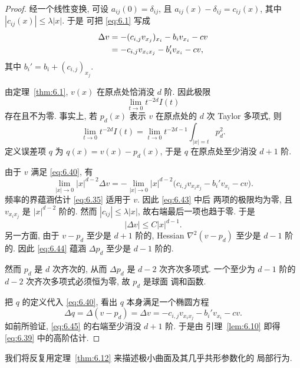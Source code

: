 \begin{proof}
经一个线性变换, 可设 $a_{ij}(0)=\delta_{ij}$, 且
$a_{ij}(x)-\delta_{ij}=c_{ij}(x)$, 其中 $|c_{ij}(x)|\leq\lambda|x|$. 于是
可把 \eqref{eq:6.1} 写成
\begin{align}
\Delta v&=-(c_{i,j}v_{x_j})_{x_i}-b_iv_{x_i}-cv\notag\\
&=-c_{i,j}v_{x_ix_j}-b_i'v_{x_i}-cv,
\label{eq:6.40}
\end{align}
其中 $b_i'=b_i+(c_{i,j})_{x_j}$.

由定理~\ref{thm:6.1}, $v(x)$ 在原点处恰消没 $d$ 阶. 因此极限
\begin{equation}
\lim_{t\to0}t^{-2d}I(t)
\label{eq:6.41}
\end{equation}
存在且不为零. 事实上, 若 $p_d(x)$ 表示 $v$ 在原点处的 $d$ 次 Taylor
多项式, 则
\begin{equation}
\lim_{t\to0}t^{-2d}I(t)=\lim_{t\to0}t^{-2d-1}\int_{|x|=t}p_d^2.
\label{eq:6.42}
\end{equation}
定义误差项 $q$ 为 $q(x)=v(x)-p_d(x)$, 于是 $q$ 在原点处至少消没 $d+1$ 阶.

由于 $v$ 满足 \eqref{eq:6.40}, 有
\begin{equation}
\lim_{|x|\to0}|x|^{d-2}\Delta v
=-\lim_{|x|\to0}|x|^{d-2}\bigl(c_{i,j}v_{x_ix_j}-b_i'v_{x_i}-cv\bigr).
\label{eq:6.43}
\end{equation}
频率的界蕴涵估计 \eqref{eq:6.35} 适用于 $v$. 因此 \eqref{eq:6.43} 中后
两项的极限均为零, 且 $v_{x_ix_j}$ 是 $|x|^{d-2}$ 阶的. 然而
$|c_{ij}|\leq\lambda|x|$, 故右端最后一项也趋于零. 于是
\begin{equation}
|\Delta v|\leq C|x|^{d-1}.
\label{eq:6.44}
\end{equation}
另一方面, 由于 $v-p_d$ 至少是 $d+1$ 阶的, Hessian $\nabla^2(v-p_d)$
至少是 $d-1$ 阶的. 因此 \eqref{eq:6.44} 蕴涵 $\Delta p_d$ 至少是
$d-1$ 阶的.

然而 $p_d$ 是 $d$ 次齐次的, 从而 $\Delta p_d$ 是 $d-2$ 次齐次多项式.
一个至少为 $d-1$ 阶的 $d-2$ 次齐次多项式必须恒为零, 故 $p_d$ 是球面
调和函数.

把 $q$ 的定义代入 \eqref{eq:6.40}, 看出 $q$ 本身满足一个椭圆方程
\begin{equation}
\Delta q=\Delta(v-p_d)=\Delta v
=-c_{i,j}v_{x_ix_j}-b_i'v_{x_i}-cv.
\label{eq:6.45}
\end{equation}
如前所验证, \eqref{eq:6.45} 的右端至少消没 $d+1$ 阶. 于是由
引理~\ref{lem:6.10} 即得 \eqref{eq:6.39} 中的高阶估计.
\end{proof}

我们将反复用定理~\ref{thm:6.12} 来描述极小曲面及其几乎共形参数化的
局部行为.

